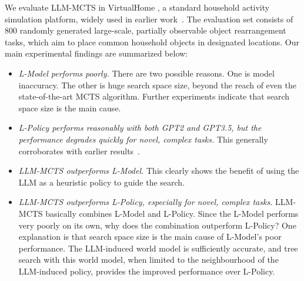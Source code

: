 We evaluate LLM-MCTS in VirtualHome \cite{puig2018virtualhome}, a standard
household activity simulation platform, widely used in earlier
work~\cite{huang2022language, li2022pre, puig2020watch, Singh2023progprompt}. 
The evaluation set consists of 800 randomly generated large-scale, partially observable object rearrangement tasks, which aim to place common household objects in designated locations. Our main experimental findings are summarized below:
\begin{itemize}
\item[F1.] \emph{L-Model performs poorly.}  There are two possible
  reasons. One is model inaccuracy. The other is huge search space size,
  beyond the reach of even the state-of-the-art MCTS algorithm. Further
  experiments indicate that search space size is the main cause.
\item[ F2.] \emph{L-Policy performs reasonably with both GPT2 and GPT3.5, but the performance degrades quickly for novel, complex tasks.} This generally corroborates with earlier results~\cite{li2022pre,huang2022language, ahn2022can, huang2022inner}.
\item[F3.] \emph{LLM-MCTS outperforms L-Model.} This clearly shows the benefit of using the LLM as a heuristic policy to guide the search.
\item[F4.] \emph{LLM-MCTS outperforms L-Policy, especially for novel, complex
    tasks.}  LLM-MCTS basically combines L-Model and L-Policy. Since the
  L-Model performs very poorly on its own, why does the combination outperform
  L-Policy? One explanation is that search space size is the main cause of
  L-Model's poor performance. The LLM-induced world model is sufficiently
  accurate, and tree search with this world model, when limited to the neighbourhood of the LLM-induced policy, provides the improved performance over L-Policy. 
\end{itemize}



